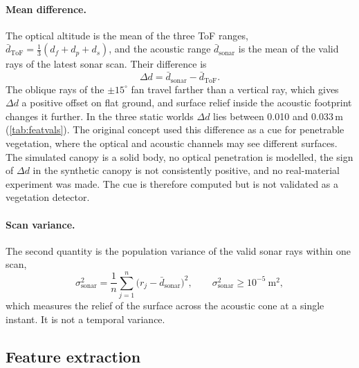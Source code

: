 \documentclass[11pt,a4paper]{article}
\begin{document}
\paragraph{Mean difference.} The optical altitude is the mean of the three ToF ranges, $\bar d_{\mathrm{ToF}}=\tfrac13(d_f+d_p+d_s)$, and the acoustic range $\bar d_{\mathrm{sonar}}$ is the mean of the valid rays of the latest sonar scan. Their difference is
\begin{equation}
\Delta d=\bar d_{\mathrm{sonar}}-\bar d_{\mathrm{ToF}} .
\end{equation}
The oblique rays of the $\pm15^\circ$ fan travel farther than a vertical ray, which gives $\Delta d$ a positive offset on flat ground, and surface relief inside the acoustic footprint changes it further. In the three static worlds $\Delta d$ lies between 0.010 and 0.033\,m (\cref{tab:featvals}). The original concept used this difference as a cue for penetrable vegetation, where the optical and acoustic channels may see different surfaces. The simulated canopy is a solid body, no optical penetration is modelled, the sign of $\Delta d$ in the synthetic canopy is not consistently positive, and no real-material experiment was made. The cue is therefore computed but is not validated as a vegetation detector.
 
\paragraph{Scan variance.} The second quantity is the population variance of the valid sonar rays within one scan,
\begin{equation}
\sigma^2_{\mathrm{sonar}}=\frac1n\sum_{j=1}^{n}\bigl(r_j-\bar d_{\mathrm{sonar}}\bigr)^2,\qquad \sigma^2_{\mathrm{sonar}}\ge10^{-5}\ \mathrm{m^2},
\end{equation}
which measures the relief of the surface across the acoustic cone at a single instant. It is not a temporal variance.
 
\subsection{Feature extraction}\label{sec:features}
\end{document}

